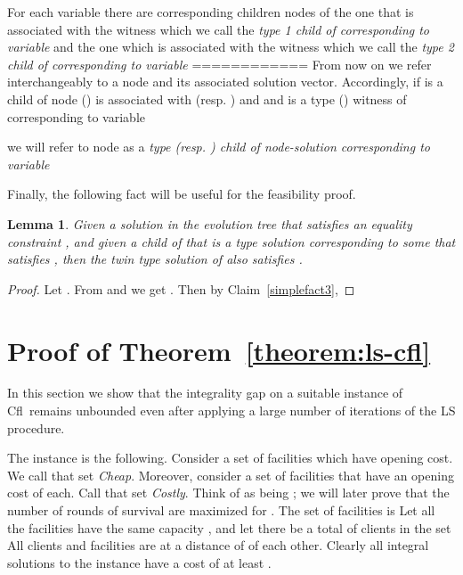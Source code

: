 \documentclass[11pt]{article}\usepackage{amsmath}
\newtheorem{lemma}{Lemma}[section]
\newcommand{\cfl}{{\sc Cfl}}
\begin{document}
For each variable 
there  are    corresponding 
children  nodes of  the  one  that is associated with   the
witness    which we call the \emph{type 1 child of
   corresponding  to variable } and  the one which is
associated with the witness  
which we call the \emph{type 2 child of  corresponding to
  variable }
============ \fi 
From now on  we  refer
interchangeably to a node and its  associated solution
vector. Accordingly, if  is a child of node   () is 
associated with  (resp. ) and 
and   is a type  () witness  of  corresponding to variable
 
we will refer to node  as 
a {\em type  (\mbox{resp.} )  child of node-solution 
  corresponding to variable } 



Finally, the following fact will be useful for the feasibility proof. 


\begin{lemma}\label{eqconlemma}
Given a solution  in  the evolution tree that satisfies an equality
constraint ,  and given a child of   that is a
type   solution   corresponding  to some    that satisfies
, then the twin  type  solution  of 
also satisfies .
\end{lemma}
\begin{proof}
Let  .   From    and
 we get . Then by
Claim~\ref{simplefact3},          
\end{proof}








\section{Proof of Theorem~\ref{theorem:ls-cfl}}
\label{sec:ls_cfl}

In  this  section we  show  that the  integrality  gap  on a  suitable
instance of \cfl\ remains unbounded even after applying a large number
of iterations of the LS procedure.  \iffalse More precisely, we reduce
the existence of protection matrices conditions to the construction of
the nodes  of an evolution  tree and we  prove that the nodes  of that
tree up to a desired depth (rounds of LS) are well defined.  \fi

The instance  is the following.  Consider a set  of 
facilities  which have   opening cost.  We call  that set
\emph{Cheap}. Moreover, 
consider a  set of  facilities  that have an opening cost  of  each.
Call that set  \emph{Costly}. Think of  as being ; we will later
prove that the number of rounds  of survival are maximized for
. The set of facilities  is   Let all the facilities have the same capacity
, and let there be a  total of  clients in the set   All clients and facilities
are at a  distance of  of  each other. Clearly all integral  solutions to the
instance have a cost of at least .
\end{document}

